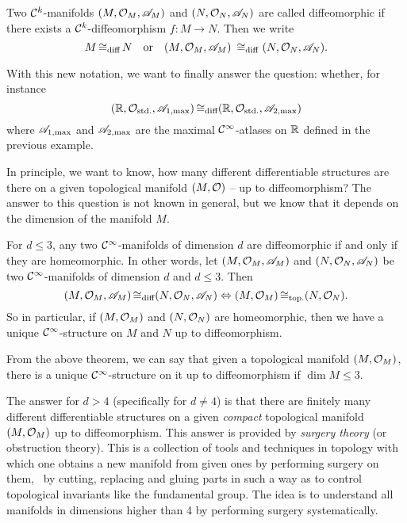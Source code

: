 \begin{definition}[Diffeomorphic]
	Two \(\mathcal C^{k}\)-manifolds \((M, \mathcal{O}_M, \mathscr{A}_M)\) and \((N, \mathcal{O}_N, \mathscr{A}_N)\) are called diffeomorphic if there exists a \(\mathcal C^{k}\)-diffeomorphism \(f: M \to N\). Then we write
	\begin{equation}
		M \operatorname{\cong_{\text{diff}}} N \quad \text{or} \quad (M, \mathcal{O}_M, \mathscr{A}_M) ~\operatorname{\cong_{\text{diff}}}~ (N, \mathcal{O}_N, \mathscr{A}_N).
	\end{equation}
\end{definition}

With this new notation, we want to finally answer the question: whether, for instance
\begin{equation}
	(\mathbb R, \mathcal{O}_{\text{std.}}, \mathscr{A}_{1, \text{max}}) \operatorname{\cong_{\text{diff}}} (\mathbb R, \mathcal{O}_{\text{std.}}, \mathscr{A}_{2, \text{max}})
\end{equation}
where \(\mathscr{A}_{1, \text{max}}\) and \(\mathscr{A}_{2, \text{max}}\) are the maximal \(\mathcal C^{\infty}\)-atlases on \(\mathbb R\) defined in the previous example.

In principle, we want to know, how many different differentiable structures are there on a given topological manifold \((M, \mathcal{O})\) -- up to diffeomorphism? The answer to this question is not known in general, but we know that it depends on the dimension of the manifold \(M\).

\begin{theorem}
	For \(d \le 3\), any two \(\mathcal C^{\infty}\)-manifolds of dimension \(d\) are diffeomorphic if and only if they are homeomorphic. In other words, let \((M, \mathcal{O}_M, \mathscr{A}_M)\) and \((N, \mathcal{O}_N, \mathscr{A}_N)\) be two \(\mathcal C^{\infty}\)-manifolds of dimension \(d\) and \(d \le 3\). Then
	\begin{equation}
		(M, \mathcal{O}_M, \mathscr{A}_M) \operatorname{\cong_{\text{diff}}} (N, \mathcal{O}_N, \mathscr{A}_N) \Leftrightarrow (M, \mathcal{O}_M) \operatorname{\cong_{\text{top.}}} (N, \mathcal{O}_N).
	\end{equation}
	So in particular, if \((M, \mathcal{O}_M)\) and \((N, \mathcal{O}_N)\) are homeomorphic, then we have a unique \(\mathcal C^{\infty}\)-structure on \(M\) and \(N\) up to diffeomorphism.
\end{theorem}

From the above theorem, we can say that given a topological manifold \((M, \mathcal{O}_M)\), there is a unique \(\mathcal C^{\infty}\)-structure on it up to diffeomorphism if \(\dim M \le 3\).

The answer for \(d > 4\) (specifically for \(d \ne 4\)) is that there are finitely many different differentiable structures on a given \emph{compact} topological manifold \((M, \mathcal{O}_M)\) up to diffeomorphism. This answer is provided by \emph{surgery theory} (or obstruction theory). This is a collection of tools and techniques in topology with which one obtains a new manifold from given ones by performing surgery on them, \ie\ by cutting, replacing and gluing parts in such a way as to control topological invariants like the fundamental group. The idea is to understand all manifolds in dimensions higher than 4 by performing surgery systematically.

